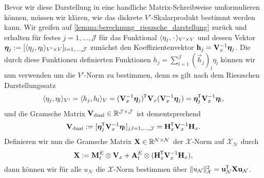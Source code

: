 \documentclass[../main.tex]{subfiles}
\begin{document}
Bevor wir diese Darstellung in eine handliche Matrix-Schreibweise umformulieren können, müssen wir klären, wie das diskrete $V'$-Skalarprodukt bestimmt werden kann.
Wir greifen auf \cref{lemma:berechnung_rieszsche_darstellung} zurück und erhalten für festes $j = 1, \dots, \mathcal J$ für das Funktional $\langle\eta_{j},{\mkern2mu\cdot\mkern2mu}\rangle_{V' \times V}$ und dessen Vektor $\bm \eta_{j} := [\langle\eta_{j},\eta_{l}\rangle_{V' \times V}]_{l = 1, \dots, \mathcal J}$ zunächst den Koeffizientenvektor $\mathbf{h}_{j} = \mathbf{V}_{x}^{-1} \bm \eta_{j}$.
Die durch diese Funktionen definierten Funktionen $h_{j} = \sum_{l = 1}^{\mathcal J} (\vec{h}_{j})_{l} \eta_{l}$ können wir nun verwenden um die $V'$-Norm zu bestimmen, denn es gilt nach dem Rieszschen Darstellungssatz
\begin{equation}
    \langle\eta_{j},\eta_{l}\rangle_{V'} = \langle h_{j},h_{l}\rangle_{V} = (\mathbf{V}_{x}^{-1} \bm \eta_{j})^{\mkern-1.5mu\mathsf{T}} \mathbf{V}_{x} (\mathbf{V}_{x}^{-1} \bm \eta_{j}) = \bm{\eta}_{j}^{\mkern-1.5mu\mathsf{T}} \mathbf{V}_{x}^{-1} \bm{\eta}_{l},
\end{equation}
und die Gramsche Matrix $\mathbf{V}_{\mathrm{dual}} \in \mathbb{R}^{\mathcal J \times \mathcal J}$ ist dementsprechend
\begin{equation}
    \mathbf{V}_{\mathrm{dual}} := [\bm{\eta}_{j}^{\mkern-1.5mu\mathsf{T}} \mathbf{V}_{x}^{-1} \bm{\eta}_{l}]_{j,l = 1, \dots, \mathcal J} = \mathbf{H}_{x}^{\mkern-1.5mu\mathsf{T}} \mathbf{V}_{x}^{-1} \mathbf{H}_{x}.
\end{equation}
Definieren wir nun die Gramsche Matrix $\mathbf{X} \in \mathbb{R}^{\mathcal N \times \mathcal N}$ der $\mathcal X$-Norm auf $\mathcal X_{\mathcal N}$ durch
\begin{equation}
    \mathbf{X} := \mathbf{M}^{E}_{t} \otimes \mathbf{V}_{x} + \mathbf{A}^{E}_{t} \otimes (\mathbf{H}_{x}^{\mkern-1.5mu\mathsf{T}} \mathbf{V}_{x}^{-1} \mathbf{H}_{x}),
\end{equation}
dann können wir für alle $u_{\mathcal N}$ die $\mathcal X$-Norm bestimmen über $\lVert u_{\mathcal N}\rVert_{\mathcal X}^{2} = \mathbf{u}_{\mathcal N}^{\mkern-1.5mu\mathsf{T}} \mathbf{X} \mathbf{u}_{\mathcal N}$.
\end{document}
